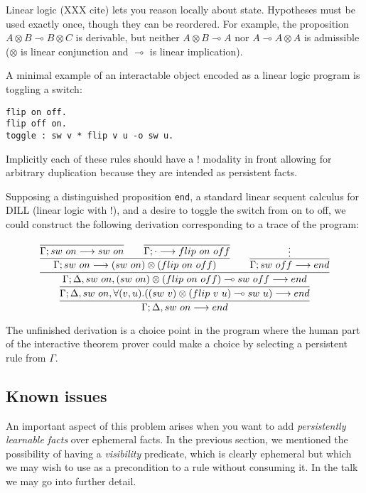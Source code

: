 \newcommand{\lolli}{\multimap}

Linear logic (XXX cite) lets you reason locally about state. Hypotheses must be used
exactly once, though they can be reordered. For example, the proposition $A
\otimes B \lolli B \otimes C$ is derivable, but neither $A \otimes B \lolli
A$ nor $A \lolli A \otimes A$ is admissible ($\otimes$ is linear
conjunction and $\lolli$ is linear implication).

A minimal example of an interactable object encoded as a linear logic
program is toggling a switch:

\begin{verbatim}
flip on off.
flip off on.
toggle : sw v * flip v u -o sw u.
\end{verbatim}

Implicitly each of these rules should have a $!$ modality in front allowing
for arbitrary duplication because they are intended as persistent facts.

Supposing a distinguished proposition \verb|end|, a standard linear sequent
calculus for DILL (linear logic with $!$), and a desire to toggle the
switch from on to off, we could construct the following derivation
corresponding to a trace of the program:

\small{
\[
\infer
{
  \Gamma; \Delta, sw\ on \longrightarrow end
}
{
  \infer
  {
    \Gamma; \Delta, sw\ on, \forall(v,u).((sw\ v)\otimes (flip\ v\
    u)\multimap sw\ u)
    \longrightarrow end
  }
  {
  \infer
    {
    \Gamma; \Delta, sw\ on, (sw\ on)\otimes (flip\ on\ off)\multimap sw\
    off
    \longrightarrow end
    }
    {
        \infer{
          \Gamma; sw\ on \longrightarrow (sw\ on)\otimes(flip\ on\ off)
          }
          {
            \infer
            {\Gamma; sw\ on \longrightarrow sw\ on}
            {}
            \qquad
            \infer
            {\Gamma; \cdot \longrightarrow flip\ on\ off}
            {}
          }
        \qquad
        \infer{
          \Gamma; sw\ off \longrightarrow end
          }
          {\vdots
          }
    }
  }
}
\]
}

The unfinished derivation is a choice point in the program where the human
part of the interactive theorem prover could make a choice by selecting a
persistent rule from $\Gamma$. 

\subsection{Known issues}

An important aspect of this problem arises when you want to add {\em
persistently learnable facts} over ephemeral facts. In the previous
section, we mentioned the possibility of having a {\em visibility}
predicate, which is clearly ephemeral but which we may wish to use as a
precondition to a rule without consuming it. In the talk we may go into
further detail.
